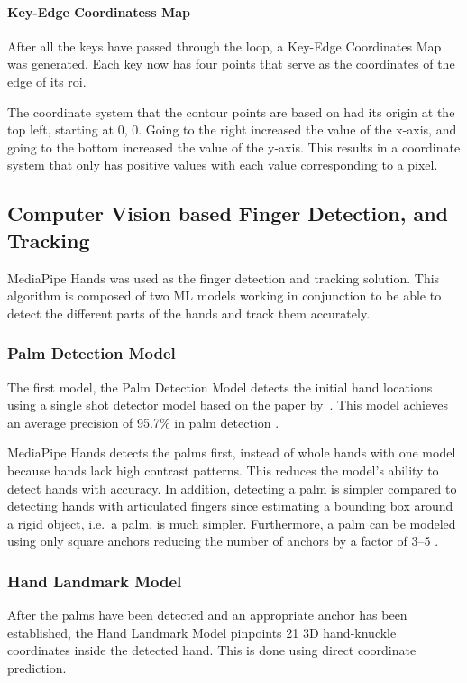 \documentclass{report}
\begin{document}
\paragraph{Key-Edge Coordinatess Map}
After all the keys have passed through the loop, a Key-Edge Coordinates Map was
generated. Each key now has four points that serve as the coordinates of the
edge of its \ac{roi}.

The coordinate system that the contour points are based on had its origin at the
top left, starting at 0, 0. Going to the right increased the value of the
x-axis, and going to the bottom increased the value of the y-axis. This results
in a coordinate system that only has positive values with each value
corresponding to a pixel.


\subsection{Computer Vision based Finger Detection, and Tracking}
\label{section:metho-algo-finger}
MediaPipe Hands was used as the finger detection and tracking solution. This
algorithm is composed of two ML models working in conjunction to be able to
detect the different parts of the hands and track them accurately.

\subsubsection{Palm Detection Model}
The first model, the Palm Detection Model detects the initial hand locations
using a single shot detector model based on the paper by~\cite{ssd}. This model
achieves an average precision of 95.7\% in palm detection
\parencite{mediapipe-hands}.

MediaPipe Hands detects the palms first, instead of whole hands with one model
because hands lack high contrast patterns. This reduces the model's ability to
detect hands with accuracy. In addition, detecting a palm is simpler compared
to detecting hands with articulated fingers since estimating a bounding box
around a rigid object, i.e.\ a palm, is much simpler. Furthermore, a palm can be
modeled using only square anchors reducing the number of anchors by a factor of
3--5 \parencite{mediapipe-hands}.

\subsubsection{Hand Landmark Model}
After the palms have been detected and an appropriate anchor has been
established, the Hand Landmark Model pinpoints 21 3D hand-knuckle coordinates
inside the detected hand. This is done using direct coordinate prediction.
\end{document}
